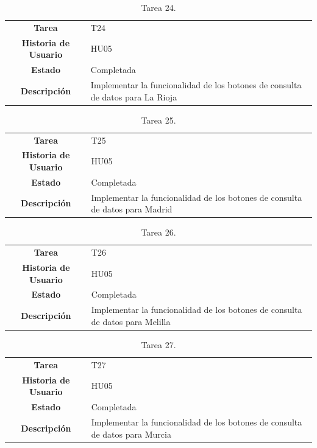 \begin{table}[H]
	\begin{center}
		\begin{tabular}{| c | p{9cm} |}
			\hline
			
			\textbf{Tarea} & T24 \\
			\textbf{Historia de Usuario} & HU05 \\
			\textbf{Estado} & Completada \\
			\textbf{Descripción} & Implementar la funcionalidad de los botones de consulta de datos para La Rioja \\ \hline
		\end{tabular}
		\caption{Tarea 24.}
	\end{center}
\end{table}

\begin{table}[H]
	\begin{center}
		\begin{tabular}{| c | p{9cm} |}
			\hline
			
			\textbf{Tarea} & T25 \\
			\textbf{Historia de Usuario} & HU05 \\
			\textbf{Estado} & Completada \\
			\textbf{Descripción} & Implementar la funcionalidad de los botones de consulta de datos para Madrid \\ \hline
		\end{tabular}
		\caption{Tarea 25.}
	\end{center}
\end{table}

\begin{table}[H]
	\begin{center}
		\begin{tabular}{| c | p{9cm} |}
			\hline
			
			\textbf{Tarea} & T26 \\
			\textbf{Historia de Usuario} & HU05 \\
			\textbf{Estado} & Completada \\
			\textbf{Descripción} & Implementar la funcionalidad de los botones de consulta de datos para Melilla \\ \hline
		\end{tabular}
		\caption{Tarea 26.}
	\end{center}
\end{table}

\begin{table}[H]
	\begin{center}
		\begin{tabular}{| c | p{9cm} |}
			\hline
			
			\textbf{Tarea} & T27 \\
			\textbf{Historia de Usuario} & HU05 \\
			\textbf{Estado} & Completada \\
			\textbf{Descripción} & Implementar la funcionalidad de los botones de consulta de datos para Murcia \\ \hline
		\end{tabular}
		\caption{Tarea 27.}
	\end{center}
\end{table}

